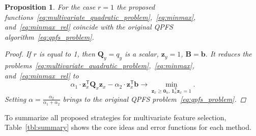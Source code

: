 \documentclass[12pt,oneside]{article}
\newtheorem{proposition}{Proposition}
\theoremstyle{definition}
\newcommand{\bz}{\mathbf{z}}
\newcommand{\bb}{\mathbf{b}}
\newcommand{\bB}{\mathbf{B}}
\newcommand{\bQ}{\mathbf{Q}}
\newcommand{\T}{\mathsf{T}}
\newcommand{\bOne}{\boldsymbol{1}}
\newcommand{\bZero}{\boldsymbol{0}}
\begin{document}
\begin{proposition}
	For the case $r=1$ the proposed functions~\eqref{eq:multivariate_quadratic_problem},~\eqref{eq:minmax}, and~\eqref{eq:minmax_rel} coincide with the original QPFS algorithm~\eqref{eq:qpfs_problem}.

	\begin{proof}
		If $r$ is equal to 1, then $\bQ_y = q_y$ is a scalar, $\bz_y = 1$, $\bB = \bb$. It reduces the problems~\eqref{eq:multivariate_quadratic_problem},~\eqref{eq:minmax}, and~\eqref{eq:minmax_rel} to
		\begin{equation}
		\alpha_1 \cdot \bz_x^{\T} \bQ_x \bz_x - \alpha_2 \cdot \bz_x^{\T} \bb \rightarrow \min_{\bz_x \geq \bZero_n, \, \bOne_n^{\T}\bz_x=1} .
		\end{equation}
		Setting $\alpha = \frac{\alpha_2}{\alpha_1 + \alpha_2}$ brings to the original QPFS problem~\eqref{eq:qpfs_problem}.
	\end{proof}
\end{proposition}

To summarize all proposed strategies for multivariate feature selection, Table~\ref{tbl:summary} shows the core ideas and error functions for each method. 
\end{document}

